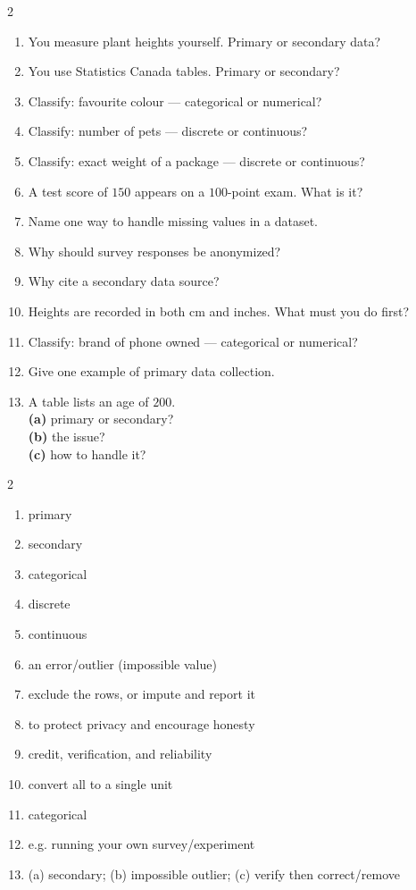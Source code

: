 \documentclass[11pt]{article}
\begin{document}
\clearpage
{}

\begin{recapbox}
\begin{multicols}{2}
\small
\begin{enumerate}[leftmargin=*,itemsep=3pt]
  \item You measure plant heights yourself. Primary or secondary data?
  \item You use Statistics Canada tables. Primary or secondary?
  \item Classify: favourite colour --- categorical or numerical?
  \item Classify: number of pets --- discrete or continuous?
  \item Classify: exact weight of a package --- discrete or continuous?
  \item A test score of $150$ appears on a $100$-point exam. What is it?
  \item Name one way to handle missing values in a dataset.
  \item Why should survey responses be anonymized?
  \item Why cite a secondary data source?
  \item Heights are recorded in both cm and inches. What must you do first?
  \item Classify: brand of phone owned --- categorical or numerical?
  \item Give one example of primary data collection.
  \item A table lists an age of $200$. \\ \textbf{(a)} primary or secondary? \\ \textbf{(b)} the issue? \\ \textbf{(c)} how to handle it?
\end{enumerate}
\end{multicols}
\end{recapbox}

\begin{keybox}
\begin{multicols}{2}
\small
\begin{enumerate}[leftmargin=*,itemsep=3pt]
  \item primary
  \item secondary
  \item categorical
  \item discrete
  \item continuous
  \item an error/outlier (impossible value)
  \item exclude the rows, or impute and report it
  \item to protect privacy and encourage honesty
  \item credit, verification, and reliability
  \item convert all to a single unit
  \item categorical
  \item e.g. running your own survey/experiment
  \item (a) secondary; (b) impossible outlier; (c) verify then correct/remove
\end{enumerate}
\end{multicols}
\end{keybox}
\end{document}
